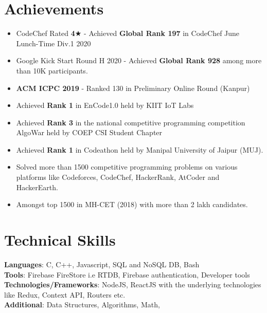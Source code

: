 \documentclass[letterpaper,11pt]{article}
\newcommand{\resumeItem}[1]{
  \item\small{
    {#1 \vspace{-2pt}}
  }
}
\newcommand{\resumeSubHeadingListStart}{\begin{itemize}[leftmargin=0.0in, label={}]}
\newcommand{\resumeSubHeadingListEnd}{\end{itemize}}
\newcommand{\resumeItemListStart}{\begin{itemize}}
\newcommand{\resumeItemListEnd}{\end{itemize}\vspace{-5pt}}
\begin{document}
\section{Achievements}
    \resumeSubHeadingListStart
        \resumeItemListStart
            \resumeItem{CodeChef \href{https://www.codechef.com/users/shahayush2507}{\raisebox{-0.2\height}\faExternalLink} Rated \textbf{4}$\bigstar$ - Achieved \textbf{Global Rank 197} in CodeChef June Lunch-Time Div.1 2020 \href{https://www.codechef.com/rankings/LTIME85A?order=asc&search=shahayush2507&sortBy=rank}{\raisebox{-0.2\height}\faExternalLink}
            }
            \resumeItem{
            Google Kick Start Round H 2020 - Achieved \textbf{Global Rank 928} among more than 10K participants.
            }
            \resumeItem{
            \textbf{ACM ICPC 2019} - Ranked 130 in Preliminary Online Round (Kanpur) \href{https://icpc.global/ICPCID/GSHFQCIGSEAA}{\raisebox{-0.2\height}\faExternalLink}
            }
            \resumeItem{
            Achieved \textbf{Rank 1} in EnCode1.0 held by KIIT IoT Labs 
            }
            \resumeItem{
            Achieved \textbf{Rank 3} in the national competitive programming competition AlgoWar held by COEP CSI Student Chapter
            }
            \resumeItem{
            Achieved \textbf{Rank 1} in Codeathon held by Manipal University of Jaipur (MUJ).
            }
            \resumeItem{
            Solved more than 1500 competitive programming problems on various platforms like Codeforces, CodeChef, HackerRank, AtCoder and HackerEarth. \href{https://www.stopstalk.com/user/profile/omega07}{\raisebox{-0.2\height}\faExternalLink}
            }
            \resumeItem{
            Amongst top 1500 in MH-CET (2018) with more than 2 lakh candidates.
            }
        \resumeItemListEnd
        
    \resumeSubHeadingListEnd


\section{Technical Skills}
 \begin{itemize}[leftmargin=0.15in, label={}]
    \small{\item{
     \textbf{Languages}{: C, C++, Javascript, SQL and NoSQL DB, Bash} \\
     \textbf{Tools}{: Firebase FireStore i.e RTDB, Firebase authentication, Developer tools } \\
     \textbf{Technologies/Frameworks}{: NodeJS, ReactJS with the underlying technologies like Redux, Context API, Routers etc.} \\
     \textbf{Additional}{: Data Structures, Algorithms, Math, } \\
    }}
 \end{itemize}
 \vspace{-16pt}
\end{document}
